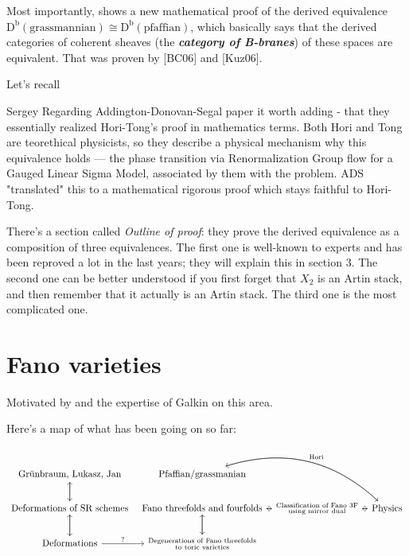 {\color{2}Most importantly},  \cite{pfgr} shows a new mathematical proof of the derived equivalence $\operatorname{D^b}(\text{grassmannian} )\cong \operatorname{D^b}(\text{pfaffian} )$, which basically says that the derived categories of coherent sheaves (the  \textit{\textbf{category of B-branes}}) of these spaces are equivalent. That was proven by [BC06] and [Kuz06].

Let's recall

\begin{thing14}{Sergey}\leavevmode
Regarding Addington-Donovan-Segal paper it worth adding - that they essentially realized Hori-Tong's proof in mathematics terms. Both Hori and Tong are teorethical physicists, so they describe a physical mechanism why this equivalence holds — the phase transition via Renormalization Group flow for a Gauged Linear Sigma Model, associated by them with the problem. ADS "translated" this to a mathematical rigorous proof which stays faithful to Hori-Tong.
\end{thing14}

There's a section called \textit{Outline of proof}: they prove the derived equivalence as a composition of three equivalences. The first one is well-known to experts and has been reproved a lot in the last years; they will explain this in section 3. The second one can be better understood if you first forget that $X_2$ is an Artin stack, and then remember that it actually is an Artin stack. The third one is the most complicated one.

\section{Fano varieties}

Motivated by \cite{jan4} and the expertise of Galkin on this area.

Here's a map of what has been going on so far:

\[\begin{tikzcd}[column sep=tiny]
	\text{Grünbraum, Lukasz, Jan} \arrow[d]& \text{Pfaffian/grassmanian} \arrow[rrd,"\text{Hori}",bend left]&\\
	\text{Deformations of SR schemes}\arrow[u] \arrow[d]& \text{Fano threefolds and fourfolds} \arrow[d]\arrow[r]&\substack{\text{Classification of Fano 3F}  \\ \text{using mirror dual} }\arrow[l]\arrow[r]&\text{Physics}\arrow[l]\arrow[ull,bend right]   \\
\text{Deformations} \arrow[u]\arrow[r,"?"]	&\substack{\text{Degenerations of Fano threefolds}  \\ \text{to toric varieties} }\arrow[u] 
\end{tikzcd}\]

